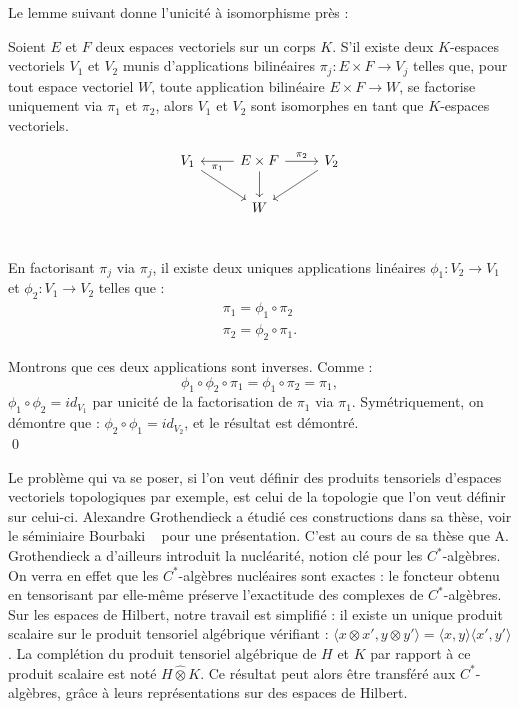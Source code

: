 Le lemme suivant donne l'unicité à isomorphisme près :

\begin{lem}
Soient $E$ et $F$ deux espaces vectoriels sur un corps $K$. S'il existe deux $K$-espaces vectoriels $V_1$ et $V_2$ munis d'applications bilinéaires $\pi_j : E\times F \rightarrow V_j$ telles que, pour tout espace vectoriel $W$, toute application bilinéaire $E\times F \rightarrow W$,  se factorise uniquement via $\pi_1$ et $\pi_2$, alors $V_1$ et $V_2$ sont isomorphes en tant que $K$-espaces vectoriels.
\end{lem}


\[\begin{tikzcd}
V_1 \arrow{dr}& \arrow{l}{\pi_1}	E\times F \arrow{d}\arrow{r}{\pi_2}	& \arrow{dl}V_2 \\
			 & 		W		&	\\
\end{tikzcd}\]

\begin{dem}
En factorisant $\pi_j$ via $\pi_j$, il existe deux uniques applications linéaires $\phi_1 : V_2\rightarrow V_1$ et $\phi_2 : V_1\rightarrow V_2$ telles que :
\[\begin{array}{c}\pi_1=\phi_1\circ \pi_2 \\ \pi_2=\phi_2\circ \pi_1.\end{array}\]

Montrons que ces deux applications sont inverses. Comme :
\[\phi_1\circ \phi_2 \circ \pi_1 = \phi_1\circ \pi_2 =\pi_1 ,\]
$\phi_1\circ \phi_2 = id_{V_1}$ par unicité de la factorisation de $\pi_1$ via $\pi_1$.
Symétriquement, on démontre que : $\phi_2\circ \phi_1 = id_{V_2}$, et le résultat est démontré.\\
\qed
\end{dem}

Le problème qui va se poser, si l'on veut définir des produits tensoriels d'espaces vectoriels topologiques par exemple, est celui de la topologie que l'on veut définir sur celui-ci. Alexandre Grothendieck a étudié ces constructions dans sa thèse, voir le séminiaire Bourbaki ~\cite{GrothendieckNuc} pour une présentation. C'est au cours de sa thèse que A. Grothendieck a d'ailleurs introduit la nucléarité, notion clé pour les $C^*$-algèbres. On verra en effet que les $C^*$-algèbres nucléaires sont exactes : le foncteur obtenu en tensorisant par elle-même préserve l'exactitude des complexes de $C^*$-algèbres.\\

Sur les espaces de Hilbert, notre travail est simplifié : il existe un unique produit scalaire sur le produit tensoriel algébrique vérifiant : $\langle x\otimes x', y\otimes y'\rangle=\langle x, y\rangle \langle x',y' \rangle$. La complétion du produit tensoriel algébrique de $H$ et $K$ par rapport à ce produit scalaire est noté $H\hat \otimes K$. Ce résultat peut alors être transféré aux $C^*$-algèbres, grâce à leurs représentations sur des espaces de Hilbert. 

